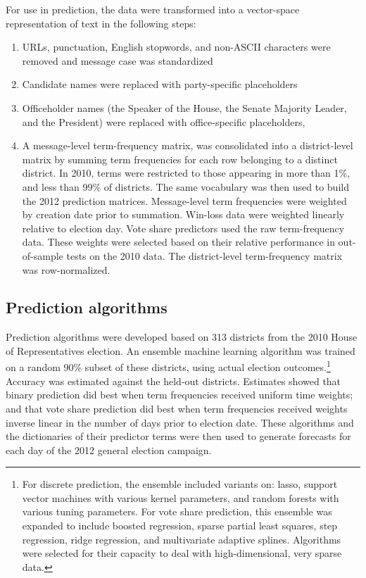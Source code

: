 \documentclass{article}
\begin{document}
For use in prediction, the data were transformed into a vector-space
representation of text in the following steps:
\begin{enumerate}
\item URLs, punctuation, English stopwords, and non-ASCII characters were removed and
  message case was standardized
\item Candidate names were replaced with party-specific placeholders
\item Officeholder names (the Speaker of the House, the Senate
  Majority Leader, and the President) were replaced with
  office-specific placeholders,
\item A message-level term-frequency matrix,
  was consolidated into a district-level matrix by summing term
  frequencies for each row belonging to a distinct district. In 2010,
  terms were restricted to those appearing in more than 1\%, and less
  than 99\% of districts. The same vocabulary was then used to build
  the 2012 prediction matrices. Message-level term frequencies were
  weighted by creation date prior to summation. Win-loss data were
   weighted linearly relative to election
  day. Vote share 
  predictors used the raw term-frequency data. These weights were
  selected based on their relative performance in out-of-sample tests
  on the 2010 data. The district-level term-frequency matrix was row-normalized.
\end{enumerate}

\subsection{Prediction algorithms}
\label{sec:pred-algor}

Prediction algorithms were developed based on 313 districts from the 2010 House of
Representatives election. An ensemble machine learning
algorithm \cite{van2007super} was trained on a random 90\% subset of
these districts, using actual election outcomes.\footnote{For discrete
  prediction, the ensemble
included variants on: lasso, support vector machines with various
kernel parameters, and random forests with various tuning
parameters. For vote share prediction, this ensemble was expanded to
include boosted regression, sparse partial least squares, step
regression, ridge regression, and multivariate adaptive splines. Algorithms were selected for their capacity to deal with
high-dimensional, very sparse data.} Accuracy was
estimated against the held-out districts. Estimates showed that binary
prediction did best when term frequencies received uniform time
weights; and that vote share prediction did best when term frequencies
received weights inverse linear in the number of days prior to
election date. These algorithms and the dictionaries of their
predictor terms were then used to generate forecasts for each day of
the 2012 general election campaign.
\end{document}
